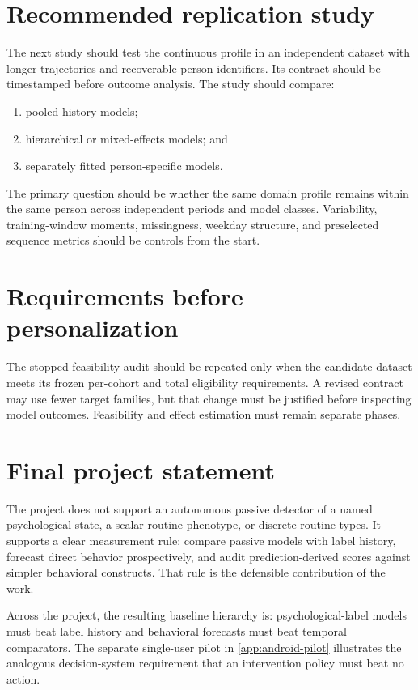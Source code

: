 \documentclass[a4paper,11pt,oneside]{report}
\begin{document}
\section{Recommended replication study}

The next study should test the continuous profile in an independent dataset with
longer trajectories and recoverable person identifiers. Its contract should be
timestamped before outcome analysis. The study should compare:

\begin{enumerate}
  \item pooled history models;
  \item hierarchical or mixed-effects models; and
  \item separately fitted person-specific models.
\end{enumerate}

The primary question should be whether the same domain profile remains within the
same person across independent periods and model classes. Variability, training-window
moments, missingness, weekday structure, and preselected sequence metrics should be
controls from the start.

\section{Requirements before personalization}

The stopped feasibility audit should be repeated only when the candidate dataset
meets its frozen per-cohort and total eligibility requirements. A revised contract
may use fewer target families, but that change must be justified before inspecting
model outcomes. Feasibility and effect estimation must remain separate phases.

\section{Final project statement}

The project does not support an autonomous passive detector of a named psychological
state, a scalar routine phenotype, or discrete routine types. It supports a clear
measurement rule: compare passive models with label history, forecast direct behavior
prospectively, and audit prediction-derived scores against simpler behavioral
constructs. That rule is the defensible contribution of the work.

Across the project, the resulting baseline hierarchy is: psychological-label models
must beat label history and behavioral forecasts must beat temporal comparators.
The separate single-user pilot in \cref{app:android-pilot} illustrates the analogous
decision-system requirement that an intervention policy must beat no action.
\end{document}
